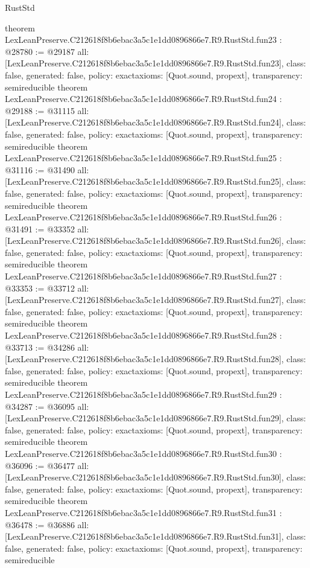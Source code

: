 \begin{lexlean}{RustStd}
\begin{coremodule}
{}
theorem LexLeanPreserve.C212618f8b6ebac3a5c1e1dd0896866e7.R9.RustStd.fun23 : @28780 := @29187 {
  all: [LexLeanPreserve.C212618f8b6ebac3a5c1e1dd0896866e7.R9.RustStd.fun23],
  class: false,
  generated: false,
  policy: exact{axioms: [Quot.sound, propext]},
  transparency: semireducible
}
theorem LexLeanPreserve.C212618f8b6ebac3a5c1e1dd0896866e7.R9.RustStd.fun24 : @29188 := @31115 {
  all: [LexLeanPreserve.C212618f8b6ebac3a5c1e1dd0896866e7.R9.RustStd.fun24],
  class: false,
  generated: false,
  policy: exact{axioms: [Quot.sound, propext]},
  transparency: semireducible
}
theorem LexLeanPreserve.C212618f8b6ebac3a5c1e1dd0896866e7.R9.RustStd.fun25 : @31116 := @31490 {
  all: [LexLeanPreserve.C212618f8b6ebac3a5c1e1dd0896866e7.R9.RustStd.fun25],
  class: false,
  generated: false,
  policy: exact{axioms: [Quot.sound, propext]},
  transparency: semireducible
}
theorem LexLeanPreserve.C212618f8b6ebac3a5c1e1dd0896866e7.R9.RustStd.fun26 : @31491 := @33352 {
  all: [LexLeanPreserve.C212618f8b6ebac3a5c1e1dd0896866e7.R9.RustStd.fun26],
  class: false,
  generated: false,
  policy: exact{axioms: [Quot.sound, propext]},
  transparency: semireducible
}
theorem LexLeanPreserve.C212618f8b6ebac3a5c1e1dd0896866e7.R9.RustStd.fun27 : @33353 := @33712 {
  all: [LexLeanPreserve.C212618f8b6ebac3a5c1e1dd0896866e7.R9.RustStd.fun27],
  class: false,
  generated: false,
  policy: exact{axioms: [Quot.sound, propext]},
  transparency: semireducible
}
theorem LexLeanPreserve.C212618f8b6ebac3a5c1e1dd0896866e7.R9.RustStd.fun28 : @33713 := @34286 {
  all: [LexLeanPreserve.C212618f8b6ebac3a5c1e1dd0896866e7.R9.RustStd.fun28],
  class: false,
  generated: false,
  policy: exact{axioms: [Quot.sound, propext]},
  transparency: semireducible
}
theorem LexLeanPreserve.C212618f8b6ebac3a5c1e1dd0896866e7.R9.RustStd.fun29 : @34287 := @36095 {
  all: [LexLeanPreserve.C212618f8b6ebac3a5c1e1dd0896866e7.R9.RustStd.fun29],
  class: false,
  generated: false,
  policy: exact{axioms: [Quot.sound, propext]},
  transparency: semireducible
}
theorem LexLeanPreserve.C212618f8b6ebac3a5c1e1dd0896866e7.R9.RustStd.fun30 : @36096 := @36477 {
  all: [LexLeanPreserve.C212618f8b6ebac3a5c1e1dd0896866e7.R9.RustStd.fun30],
  class: false,
  generated: false,
  policy: exact{axioms: [Quot.sound, propext]},
  transparency: semireducible
}
theorem LexLeanPreserve.C212618f8b6ebac3a5c1e1dd0896866e7.R9.RustStd.fun31 : @36478 := @36886 {
  all: [LexLeanPreserve.C212618f8b6ebac3a5c1e1dd0896866e7.R9.RustStd.fun31],
  class: false,
  generated: false,
  policy: exact{axioms: [Quot.sound, propext]},
  transparency: semireducible
}
\end{coremodule}
\end{lexlean}
